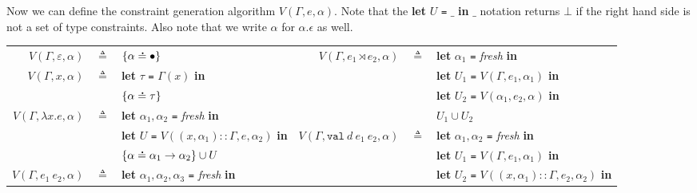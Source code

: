 \documentclass{article}
\theoremstyle{definition}
\newcommand*{\cons}{::}
\newcommand*{\A}[1]{\overset{\,_{\mbox{\Large .}}}{#1}}
\newcommand*{\modid}{d}
\newcommand*{\link}[2]{{#1}\rtimes{#2}}
\newcommand*{\Lete}{\mathtt{val}}
\begin{document}
Now we can define the constraint generation algorithm $V(\Gamma,e,\alpha)$.
Note that the \textbf{let} $U$ \texttt{=} $\_$ \textbf{in} $\_$ notation returns $\bot$ if the right hand side is not a set of type constraints.
Also note that we write $\alpha$ for $\alpha.\epsilon$ as well.

\begin{flushright}\end{flushright}
\hspace{-2.5em}
\begin{tabular}{rclrcl}
  $V(\Gamma,\varepsilon,\alpha)$ & $\triangleq$ & $\{\alpha\A{=}\bullet\}$                                                             & $V(\Gamma,\link{e_1}{e_2},\alpha)$         & $\triangleq$ & \textbf{let} $\alpha_1$ \texttt{=} \textit{fresh} \textbf{in}                       \\
  $V(\Gamma,x,\alpha)$           & $\triangleq$ & \textbf{let} $\tau$ \texttt{=} $\Gamma(x)$ \textbf{in}                               &                                            &              & \textbf{let} $U_1$ \texttt{=} $V(\Gamma,e_1,\alpha_1)$ \textbf{in}                  \\
                                 &              & $\{\alpha\A{=}\tau\}$                                                                &                                            &              & \textbf{let} $U_2$ \texttt{=} $V(\alpha_1,e_2,\alpha)$  \textbf{in}                 \\
  $V(\Gamma,\lambda x.e,\alpha)$ & $\triangleq$ & \textbf{let} $\alpha_1,\alpha_2$ \texttt{=} \textit{fresh} \textbf{in}               &                                            &              & $U_1\cup U_2$                                                                       \\
                                 &              & \textbf{let} $U$ \texttt{=} $V((x,\alpha_1)\cons\Gamma,e,\alpha_2)$ \textbf{in}      & $V(\Gamma,\Lete\:\modid\:e_1\:e_2,\alpha)$ & $\triangleq$ & \textbf{let} $\alpha_1,\alpha_2$ \texttt{=} \textit{fresh} \textbf{in}              \\
                                 &              & $\{\alpha\A{=}\alpha_1\rightarrow\alpha_2\}\cup U$                                   &                                            &              & \textbf{let} $U_1$ \texttt{=} $V(\Gamma,e_1,\alpha_1)$ \textbf{in}                  \\
  $V(\Gamma,e_1\:e_2,\alpha)$    & $\triangleq$ & \textbf{let} $\alpha_1,\alpha_2,\alpha_3$ \texttt{=} \textit{fresh} \textbf{in}      &                                            &              & \textbf{let} $U_2$ \texttt{=} $V((x,\alpha_1)\cons\Gamma,e_2,\alpha_2)$ \textbf{in} \\

\end{tabular}
\end{document}
